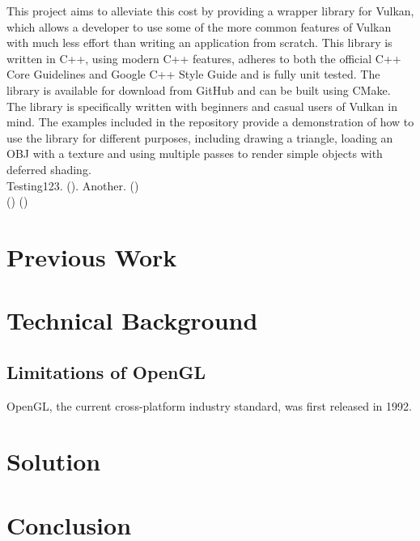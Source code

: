 \documentclass[12pt]{report}
\newcommand{\citebu}[1]{\citeauthor{#1} (\citeyear{#1})}
\theoremstyle{definition}
\begin{document}
    This project aims to alleviate this cost by providing a wrapper library for
    Vulkan, which allows a developer to use some of the more common features of
    Vulkan with much less effort than writing an application from scratch. This
    library is written in C++, using modern C++ features, adheres to both the
    official C++ Core Guidelines and Google C++ Style Guide and is fully unit
    tested. The library is available for download from GitHub and can be built
    using CMake.\\

    The library is specifically written with beginners and casual users of
    Vulkan in mind. The examples included in the repository provide a
    demonstration of how to use the library for different purposes, including
    drawing a triangle, loading an OBJ with a texture and using multiple passes
    to render simple objects with deferred shading.\\

    Testing123. \citebu{attiya1995sharing}. Another. \citebu{beyer2016site} \\

    \citebu{renderdoc} \citebu{gameEngineBook}

  \chapter{Previous Work}

  \chapter{Technical Background}

    \section{Limitations of OpenGL}
    OpenGL, the current cross-platform industry standard, was first released in 1992.

  \chapter{Solution}

  \chapter{Conclusion}
\end{document}
